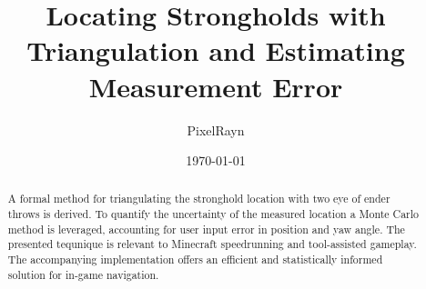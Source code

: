 \documentclass[a4paper,10pt]{article}
\title{Locating Strongholds with Triangulation and Estimating Measurement Error}
\author{PixelRayn}
\date{\today}
\begin{document}
\maketitle

\begin{abstract}
    A formal method for triangulating the stronghold location with two eye of ender throws is derived.
    To quantify the uncertainty of the measured location a Monte Carlo method is leveraged, accounting for user input error in position and yaw angle.
    The presented tequnique is relevant to Minecraft speedrunning and tool-assisted gameplay. The accompanying implementation offers an efficient and statistically informed solution for in-game navigation.
\end{abstract}


\end{document}
